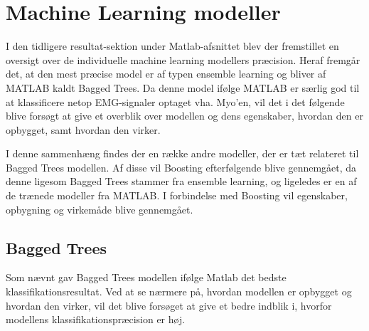 \thispagestyle{fancy}
\chapter{Machine Learning modeller}
\label{chp:mlm}
I den tidligere resultat-sektion under Matlab-afsnittet blev der fremstillet en oversigt over de individuelle machine learning modellers præcision. Heraf fremgår det, at den mest præcise model er af typen ensemble learning og bliver af MATLAB kaldt Bagged Trees. Da denne model ifølge MATLAB er særlig god til at klassificere netop EMG-signaler optaget vha. Myo'en, vil det i det følgende blive forsøgt at give et overblik over modellen og dens egenskaber, hvordan den er opbygget, samt hvordan den virker. 

I denne sammenhæng findes der en række andre modeller, der er tæt relateret til Bagged Trees modellen. Af disse vil Boosting efterfølgende blive gennemgået, da denne ligesom Bagged Trees stammer fra ensemble learning, og ligeledes er en af de trænede modeller fra MATLAB. I forbindelse med Boosting vil egenskaber, opbygning og virkemåde blive gennemgået.

\section{Bagged Trees}
\label{sec:baggedTrees}
Som nævnt gav Bagged Trees modellen ifølge Matlab det bedste klassifikationsresultat.  Ved at se nærmere på, hvordan modellen er opbygget og hvordan den virker, vil det blive forsøget at give et bedre indblik i, hvorfor modellens klassifikationspræcision er høj. 

